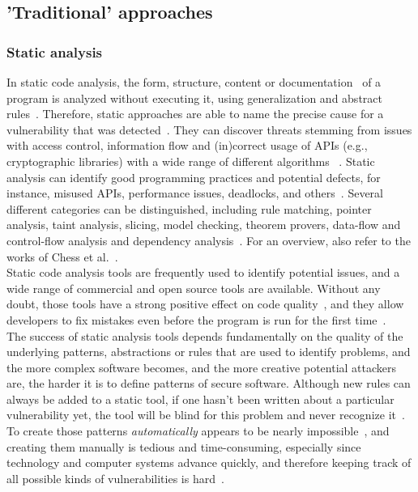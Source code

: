 \documentclass[
a4paper,
pagesize,
pdftex,
12pt,
ngerman,
fleqn,
final,
]{scrartcl}
\begin{document}
	\subsection{'Traditional' approaches}
	\subsubsection{Static analysis}
	In static code analysis, the form, structure, content or documentation~\cite{Liu.2012} of a program is analyzed without executing it, using generalization and abstract rules~\cite{Ghaffarian.2017}. Therefore, static approaches are able to name the precise cause for a vulnerability that was detected~\cite{Gupta.2014}. They can discover threats stemming from issues with access control, information flow and (in)correct usage of APIs (e.g., cryptographic libraries) with a wide range of different algorithms ~\cite{Pistoia.2007}. Static analysis can identify good programming practices and potential defects, for instance, misused APIs, performance issues, deadlocks, and others~\cite{Venkatasubramanyam.2014}. Several different categories can be distinguished, including rule matching, pointer analysis, taint analysis, slicing, model checking, theorem provers, data-flow and control-flow analysis and dependency analysis~\cite{Gupta.2014,Liu.2012}. For an overview, also refer to the works of Chess et al.~\cite{Chess.2004}.\\
	Static code analysis tools are frequently used to identify potential issues, and a wide range of commercial and open source tools are available. Without any doubt, those tools have a strong positive effect on code quality~\cite{Liu.2018}, and they allow developers to fix mistakes even before the program is run for the first time~\cite{Gupta.2014}. \\
	The success of static analysis tools depends fundamentally on the quality of the underlying patterns, abstractions or rules that are used to identify problems, and the more complex software becomes, and the more creative potential attackers are, the harder it is to define patterns of secure software. Although new rules can always be added to a static tool, if one hasn't been written about a particular vulnerability yet, the tool will be blind for this problem and never recognize it~\cite{Chess.2004}. To create those patterns \textit{automatically} appears to be nearly impossible~\cite{Rolim.2018, Yamaguchi.2012}, and creating them manually is tedious and time-consuming, especially since technology and computer systems advance quickly, and therefore keeping track of all possible kinds of vulnerabilities is hard~\cite{Ma.2017}.\\
\end{document}
